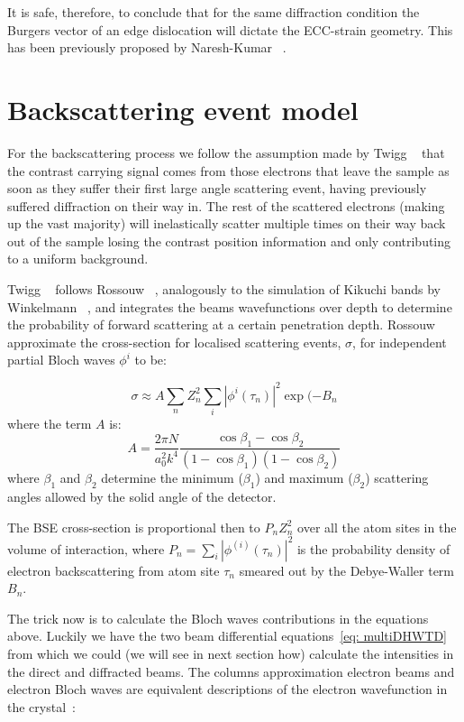 It is safe, therefore, to conclude that for the same diffraction condition the Burgers vector of an edge dislocation will dictate the ECC-strain geometry. This has been previously proposed by Naresh-Kumar \etal~\cite{Naresh}.



\section{Backscattering event model}


For the backscattering process we follow the assumption made by Twigg \etal~\cite{Twigg09} that the contrast carrying signal comes from those electrons that leave the sample as soon as they suffer their first large angle scattering event, having previously suffered diffraction on their way in. The rest of the scattered electrons (making up the vast majority) will inelastically scatter multiple times on their way back out of the sample losing the contrast position information and only contributing to a uniform background. 

Twigg \etal~\cite{Twigg09} follows Rossouw \etal~\cite{Rossouw94}, analogously to the simulation of Kikuchi bands by Winkelmann \etal~\cite{Winkelmann07}, and integrates the beams wavefunctions over depth  to determine the probability of forward scattering at a certain penetration depth.  Rossouw \etal~\cite{Rossouw94}  approximate the cross-section for localised scattering events, $\sigma$, for independent partial Bloch waves $\phi^i$ to be:

\begin{equation}
    \sigma \approx A \sum_n Z_n^2 \sum_i | \phi^i(\tau_n)|^2 \exp{(-B_n}
\end{equation}
where the term $A$ is:
\begin{equation}
    A = \frac{2\pi N}{a_0^2 k^4} \frac{\cos{\beta_1} - \cos{\beta_2}}{(1-\cos{\beta_1})(1-\cos{\beta_2})}
\end{equation}
where $\beta_1$ and $\beta_2$ determine the minimum ($\beta_1$) and maximum ($\beta_2$) scattering angles allowed by the solid angle of the detector.

The BSE cross-section is proportional then to $P_n Z_n^2$ over all the atom sites in the volume of interaction, where $P_n=\sum_i |\phi^{(i)}(\tau_n)|^2$ is the probability density of electron backscattering from atom site $\tau_n$ smeared out by the Debye-Waller term $B_n$. 

The trick now is to calculate the Bloch waves contributions in the equations above. Luckily we have the two beam differential equations~\ref{eq: multiDHWTD} from which we could (we will see in next section how) calculate the intensities in the direct and diffracted beams. The columns approximation electron beams and electron Bloch waves are equivalent descriptions of the electron wavefunction in the crystal~\cite{Howie61}:


